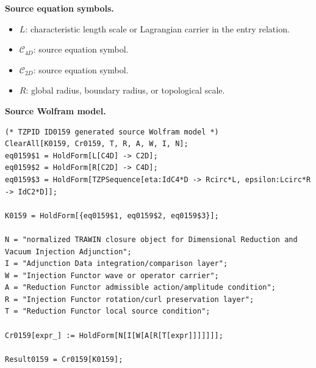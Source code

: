 \begin{minipage}[t]{0.49\linewidth}
\begingroup
\small
\raggedright
\textbf{Source equation symbols.}\par
\begin{itemize}[leftmargin=1.35em,itemsep=1pt,topsep=1pt,parsep=0pt]
    \item $L$: characteristic length scale or Lagrangian carrier in the entry relation.
    \item $\mathcal{C}_{4D}$: source equation symbol.
    \item $\mathcal{C}_{2D}$: source equation symbol.
    \item $R$: global radius, boundary radius, or topological scale.
\end{itemize}
\endgroup
\end{minipage}\hfill
\begin{minipage}[t]{0.47\linewidth}
\begingroup
\scriptsize
\raggedright
\textbf{Source Wolfram model.}\par
\begin{Verbatim}[fontsize=\tiny,breaklines=true,breakanywhere=true]
(* TZPID ID0159 generated source Wolfram model *)
ClearAll[K0159, Cr0159, T, R, A, W, I, N];
eq0159$1 = HoldForm[L[C4D] -> C2D];
eq0159$2 = HoldForm[R[C2D] -> C4D];
eq0159$3 = HoldForm[TZPSequence[eta:IdC4*D -> Rcirc*L, epsilon:Lcirc*R -> IdC2*D]];

K0159 = HoldForm[{eq0159$1, eq0159$2, eq0159$3}];

N = "normalized TRAWIN closure object for Dimensional Reduction and Vacuum Injection Adjunction";
I = "Adjunction Data integration/comparison layer";
W = "Injection Functor wave or operator carrier";
A = "Reduction Functor admissible action/amplitude condition";
R = "Injection Functor rotation/curl preservation layer";
T = "Reduction Functor local source condition";

Cr0159[expr_] := HoldForm[N[I[W[A[R[T[expr]]]]]]];

Result0159 = Cr0159[K0159];
\end{Verbatim}
\endgroup
\end{minipage}

